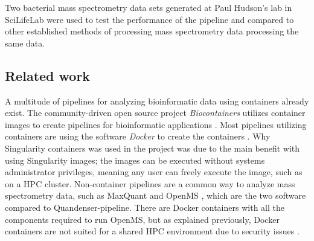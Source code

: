 Two bacterial mass spectrometry data sets generated at Paul Hudson's lab in SciLifeLab were used to test the performance of the pipeline and compared to other established methods of processing mass spectrometry data processing the same data.

\subsection{Related work}
A multitude of pipelines for analyzing bioinformatic data using containers already exist. The community-driven open source project \textit{Biocontainers} utilizes container images to create pipelines for bioinformatic applications \cite{biocontainers}. Most pipelines utilizing containers are using the software \textit{Docker} to create the containers \cite{docker}. Why Singularity containers was used in the project was due to the main benefit with using Singularity images; the images can be executed without systems administrator privileges, meaning any user can freely execute the image, such as on a HPC cluster. Non-container pipelines are a common way to analyze mass spectrometry data, such as MaxQuant and OpenMS \cite{maxquant} \cite{openms}, which are the two software compared to Quandenser-pipeline. There are Docker containers with all the components required to run OpenMS, but as explained previously, Docker containers are not suited for a shared HPC environment due to security issues \cite{openms-hpc}.
